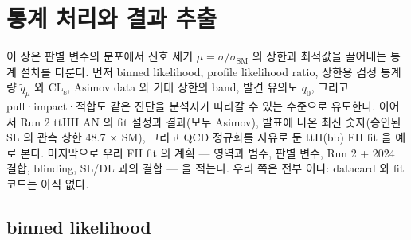 \chapter{통계 처리와 결과 추출}\label{ch:stats}

이 장은 판별 변수의 분포에서 신호 세기 $\mu=\sigma/\sigma_{\mathrm{SM}}$ 의 상한과 최적값을 끌어내는 통계 절차를 다룬다. 먼저 binned likelihood, profile
likelihood ratio, 상한용 검정 통계량 $\tilde q_\mu$ 와 CL\textsubscript{s}, Asimov data 와 기대 상한의 band, 발견 유의도 $q_0$, 그리고 pull·impact·적합도
같은 진단을 분석자가 따라갈 수 있는 수준으로 유도한다. 이어서 Run 2 ttHH AN 의 fit 설정과 결과(모두 Asimov), 발표에 나온 최신 숫자(승인된 SL 의 관측
상한 48.7 × SM), 그리고 QCD 정규화를 자유로 둔 ttH(bb) FH fit 을 예로 본다. 마지막으로 우리 FH fit 의 계획 — 영역과 범주, 판별 변수, Run 2 + 2024 결합,
blinding, SL/DL 과의 결합 — 을 적는다. 우리 쪽은 전부 \tagplan 이다: datacard 와 fit 코드는 아직 없다.

\section{binned likelihood}\label{sec:stats-likelihood}

